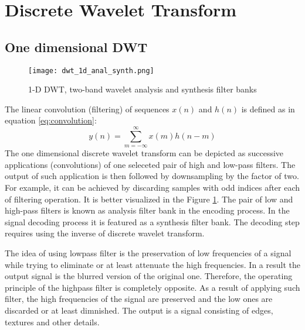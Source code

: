 \section{Discrete Wavelet Transform}

\subsection{One dimensional DWT}

\begin{figure}
    \centering
    \texttt{[image: dwt\_1d\_anal\_synth.png]}
    \caption{1-D DWT, two-band wavelet analysis and synthesis filter banks \cite{jpeg_suite}}
    \label{fig:dwt_1d_anal_synth}
\end{figure}

The linear convolution (filtering) of sequences $x(n)$ and $h(n)$ is defined as in equation \ref{eq:convolution}:
\begin{equation}
    y(n)=\sum_{m=-\infty}^{\infty}x(m)h(n-m)
\label{eq:convolution}
\end{equation}
The one dimensional discrete wavelet transform can be depicted as successive applications (convolutions) of
one seleceted pair of high and low-pass filters. The output of such application is then followed
by downsampling by the factor of two. For example, it can be achieved by discarding samples with
odd indices after each of filtering operation. It is better visualized in the Figure \ref{fig:dwt_1d_anal_synth}. \cite{jpeg_suite} 
The pair of low and high-pass filters is known as analysis filter bank in the encoding process.
In the signal decoding process it is featured as a synthesis filter bank. The decoding step requires
using the inverse of discrete wavelet transform. 

The idea of using lowpass filter is the preservation of low frequencies of a signal while trying
to eliminate or at least attenuate the high frequencies. In a result the output signal is the blurred
version of the original one. Therefore, the operating principle of the highpass filter is completely
opposite. As a result of applying such filter, the high frequencies of the signal are preserved and
the low ones are discarded or at least dimnished. The output is a signal consisting of edges, textures
and other details. \cite{jpeg_suite} 

